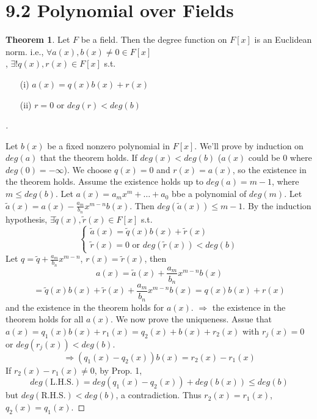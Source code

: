\documentclass{article}
\theoremstyle{definition}
\newtheorem{thm}{Theorem}
\newenvironment{proofs}[1][\proofname]{%
  \begin{proof}[#1]$ $\par\nobreak\ignorespaces
}{%
  \end{proof}
}
\begin{document}
\section{9.2 Polynomial over Fields}


\begin{thm}
  Let $F$ be a field. Then the degree function on $F[x]$ is an Euclidean norm. i.e.,  $\forall a(x), b(x) \neq 0 \in F[x]$ \\, $\exists ! q(x), r(x) \in F[x]$ s.t. 
    \begin{itemize}
      \item[(i)] $a(x) = q(x) b(x) + r(x)$
      \item[(ii)] $r = 0$ or $deg(r) < deg(b)$
    \end{itemize}
\end{thm}


\begin{proofs}
  Let $b(x)$ be a fixed nonzero polynomial in $F[x]$. We'll prove by induction on $deg(a)$ that the theorem holds. If $deg(x) < deg(b)$ ($a(x)$ could be 0 where $deg(0) = - \infty$). We choose $q(x) = 0$ and $r(x) = a(x)$, so the existence in the theorem holds. Assume the existence holds up to $deg(a) = m - 1$, where $m \leq deg(b)$. Let $a(x) = a_m x^m + \hdots + a_0$ bbe a polynomial of $deg(m)$. Let $\tilde{a}(x) = a(x) - \frac{a_m}{b_n} x^{m - n} b(x)$. Then $deg(\tilde{a}(x)) \leq m - 1$. By the induction hypothesis, $\exists \tilde{q}(x), \tilde{r}(x) \in F[x]$ s.t. 
  $$
  \left\{
  \begin{array}{c}
    \tilde{a}(x) = \tilde{q}(x) b(x) + \tilde{r}(x)\\
    \tilde{r}(x) = 0 \text{ or }  deg(\tilde{r}(x)) < deg(b)
  \end{array}
  \right.
  $$
  Let $q = \tilde{q} + \frac{a_m}{b_n} x^{m - n}$, $r(x) = \tilde{r}(x)$, then
  $$a(x) = \tilde{a}(x) + \frac{a_m}{b_n} x^{m - n} b(x) $$
  $$ = \tilde{q}(x) b(x) + \tilde{r}(x) + \frac{a_m}{b_n} x^{m - n} b(x) = q(x) b(x) + r(x)$$
  and the existence in the theorem holds for $a(x)$. $\Rightarrow$ the existence in the theorem holds for all $a(x)$. We now prove the uniqueness. Assue that $a(x) = q_1(x) b(x) + r_1(x) = q_2(x) + b(x) + r_2(x)$ with $r_j(x) = 0$ or $deg(r_j(x)) < deg(b)$.
  $$\Rightarrow (q_1(x) - q_2(x)) b(x) = r_2(x) - r_1(x)$$ 
  If $r_2(x) - r_1(x) \neq 0$, by Prop. 1, 
  $$deg(\text{L.H.S.})  = deg(q_1(x) - q_2(x)) + deg(b(x)) \leq deg(b)$$
  but $deg(\text{R.H.S.}) < deg(b)$, a contradiction. Thus $r_2(x) = r_1(x)$, $q_2(x) = q_1(x)$. 
\end{proofs}
\end{document}
